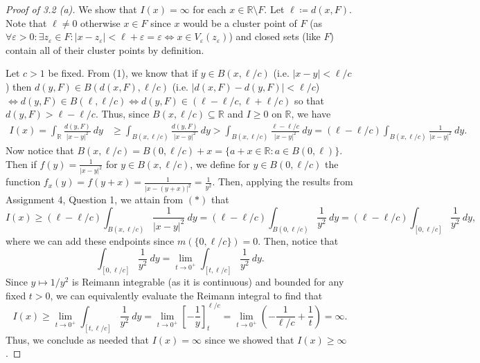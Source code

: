 \begin{proof}[Proof of 3.2 (a)]
We show that \( I(x) = \infty \) for each \( x \in \mathbb{R} \setminus F \). Let \( \ell \coloneqq d(x, F) \). Note that \( \ell \neq 0 \) otherwise \( x \in F \) since \( x \) would be a cluster point of \( F \) (as \( \forall \varepsilon > 0 : \exists z_{\varepsilon } \in F : |x - z_{\varepsilon } | <\ell+ \varepsilon = \varepsilon  \iff x \in V_{\varepsilon } (z_{\varepsilon } ) \)) and closed sets (like \( F \)) contain all of their cluster points by definition. 

Let \( c > 1 \) be fixed. From (1), we know that if \( y \in B(x, \ell / c) \) (i.e. \( |x-y| < \ell/c \)) then \( d(y,F) \in B(d(x, F), \ell / c)\) (i.e. \(|d(x,F) - d(y,F)| < \ell / c \)) \( \iff d(y,F) \in  B(\ell, \ell/c) \iff d(y,F) \in (\ell - \ell/c, \ell + \ell/c) \) so that \( d(y,F) > \ell - \ell / c \). Thus, since \( B(x, \ell/c) \subseteq \mathbb{R} \) and \( I \geq 0 \) on \( \mathbb{R} \), we have
\begin{align*}
	I(x) = \int_{\mathbb{R}} \frac{d(y,F)}{|x-y|^{2} } \ dy &\geq \int_{B(x, \ell / c)} \frac{d(y,F)}{|x-y|^{2} } \ dy  > \int_{B(x, \ell / c)} \frac{\ell - \ell/c}{|x-y|^{2} } \ dy = (\ell - \ell / c) \int_{B(x, \ell / c)} \frac{1}{|x-y|^{2} } \ dy. \tag{$\ast$}
\end{align*}
Now notice that \( B(x, \ell / c) = B(0, \ell / c) + x = \{ a + x \in \mathbb{R} : a \in B(0, \ell) \}  \). Then if \( f(y) = \frac{1}{|x-y|^2}  \) for \( y \in B(x, \ell / c) \), we define for \( y \in B(0, \ell / c) \) the function \( f_{x}(y) = f( y + x ) = \frac{1}{|x - (y+x)|^{2} } = \frac{1}{y^{2} } \). Then, applying the results from Assignment 4, Question 1, we attain from \((\ast)\) that \[I(x) \geq (\ell - \ell / c) \int_{B(x, \ell / c)} \frac{1}{|x-y|^{2} } \ dy = (\ell - \ell / c) \int_{B(0, \ell / c)} \frac{1}{y^{2} } \ dy = (\ell - \ell/c)\int_{[0, \ell / c]} \frac{1}{y^{2} }  \ dy, \] where we can add these endpoints since \( m(\{ 0, \ell / c \} ) = 0 \). Then, notice that \[\int_{[0, \ell / c]} \frac{1}{y^{2} } \ dy= \lim_{{t} \to {0^{+} }} \int_{[t, \ell / c]} \frac{1}{y^{2} } \ dy.   \] Since \( y \mapsto 1/y^{2}  \) is Reimann integrable (as it is continuous) and bounded for any fixed \( t > 0 \), we can equivalently evaluate the Reimann integral to find that \[ I(x) \geq \lim_{{t} \to {0^{+} }} \int_{[t, \ell / c]} \frac{1}{y^{2} } \ dy = \lim_{{t} \to {0^{+} }} \left [ - \frac{1}{y} \right ]_{t}^{\ell / c} = \lim_{{t} \to {0^{+} }} \left( - \frac{1}{\ell / c} + \frac{1}{t}   \right)  = \infty . \] Thus, we conclude as needed that \( I(x) = \infty \) since we showed that \( I(x) \geq \infty \).
\end{proof}
